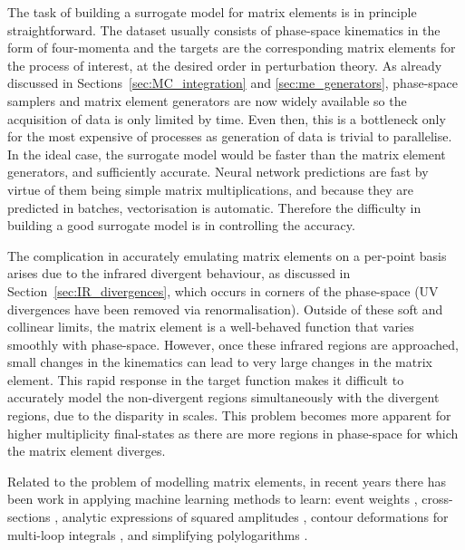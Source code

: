 \documentclass[main.tex]{subfiles}
\begin{document}
    The task of building a surrogate
    model for matrix elements is in principle straightforward.
    The dataset usually consists of phase-space kinematics
    in the form of four-momenta and the targets are the
    corresponding matrix elements for the process of interest,
    at the desired order in perturbation theory. As already
    discussed in Sections~\ref{sec:MC_integration} and \ref{sec:me_generators},
    phase-space samplers and matrix element generators are
    now widely available so the acquisition of data is only
    limited by time. Even then, this is a bottleneck only
    for the most expensive of processes as generation
    of data is trivial to parallelise. In the ideal case, the
    surrogate model would be faster than the matrix
    element generators, and sufficiently accurate. Neural
    network predictions are fast by virtue of them being
    simple matrix multiplications, and because they are predicted
    in batches, vectorisation is automatic. Therefore the difficulty
    in building a good surrogate model is in controlling
    the accuracy.

    The complication in accurately emulating matrix elements
    on a per-point basis arises due to the infrared divergent behaviour,
    as discussed in Section~\ref{sec:IR_divergences}, which occurs
    in corners of the phase-space
    (UV divergences have been removed via renormalisation).
    Outside of these soft and collinear limits, the matrix element
    is a well-behaved function that varies smoothly with phase-space.
    However, once these infrared regions are approached, small changes in the
    kinematics can lead to very large changes in the matrix
    element. This rapid response in the target
    function makes it difficult to accurately model the
    non-divergent regions simultaneously with the divergent
    regions, due to the disparity in scales. This problem
    becomes more apparent for higher multiplicity final-states
    as there are more regions in phase-space for which
    the matrix element diverges.

    Related to the problem of modelling matrix elements, in recent
    years there has been work in applying machine learning
    methods to learn: event weights \cite{Danziger:2021eeg},
    cross-sections \cite{Otten:2018kum,Buckley:2020bxg},
    analytic expressions of squared amplitudes \cite{Alnuqaydan:2022ncd},
    contour deformations for multi-loop integrals \cite{Winterhalder:2021ngy},
    and simplifying polylogarithms \cite{Dersy:2022bym}.
\end{document}
